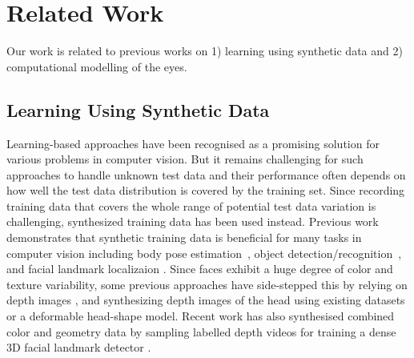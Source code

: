 
\section{Related Work}

Our work is related to previous works on 1) learning using synthetic data and 2) computational modelling of the eyes.

\subsection{Learning Using Synthetic Data}

Learning-based approaches have been recognised as a promising solution for various problems in computer vision.
But it remains challenging for such approaches to handle unknown test data and their performance often depends on how well the test data distribution is covered by the training set.
Since recording training data that covers the whole range of potential test data variation is challenging,
synthesized training data has been used instead.
Previous work demonstrates that synthetic training data is beneficial for many tasks in computer vision including body pose estimation~\cite{okada2008relevant,shotton2013real}, object detection/recognition~\cite{yu2010improving,liebelt2010multiview,jaderberg2014synthetic}, and facial landmark localizaion \cite{kaneva2011evaluation,baltrusaitis20123d,zface}.
%
Since faces exhibit a huge degree of color and texture variability, some previous approaches have side-stepped this by relying on depth images \cite{fanelli2011real,baltrusaitis20123d}, and synthesizing depth images of the head using existing datasets or a deformable head-shape model. Recent work has also synthesised combined color and geometry data by sampling labelled depth videos for training a dense 3D facial landmark detector \cite{zface}.

